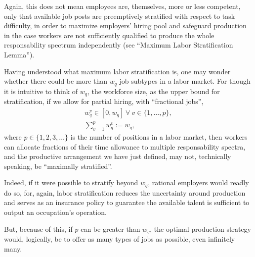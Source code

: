 \documentclass[hidelinks, nonatbib]{elsarticle}
\begin{document}
\begin{definition}
    Again, this does not mean employees are, themselves, more or less competent, only that available job posts are preemptively stratified with respect to task difficulty, in order to maximize employers' hiring pool and safeguard production in the case workers are not sufficiently qualified to produce the whole responsability spectrum independently (see ``Maximum Labor Stratification Lemma'').    
\end{definition}
Having understood what maximum labor stratification is, one may wonder whether there could be more than $w_q$ job subtypes in a labor market. For though it is intuitive to think of $w_q$, the workforce size, as the upper bound for stratification, if we allow for partial hiring, with ``fractional jobs'',
\begin{gather}
w_{q}^{v} 
\in 
[0, w_q]
\
\forall
\
v \in \{1, \dots, p\}
,
\\
\sum_{v=1}^{p}
w_{q}^{v}
:=
w_q
,
\end{gather}
where $p \in \{1, 2, 3, \dots\}$ is the number of positions in a labor market, then workers can allocate fractions of their time allowance to multiple responsability spectra, and the productive arrangement we have just defined, may not, technically speaking, be ``maximally stratified''. 

Indeed, if it were possible to stratify beyond $w_q$, rational employers would readly do so, for, again, labor stratification reduces the uncertainty around production and serves as an insurance policy to guarantee the available talent is sufficient to output an occupation's operation.

But, because of this, if $p$ can be greater than $w_q$, the optimal production strategy would, logically, be to offer as many types of jobs as possible, even infinitely many.
\end{document}
